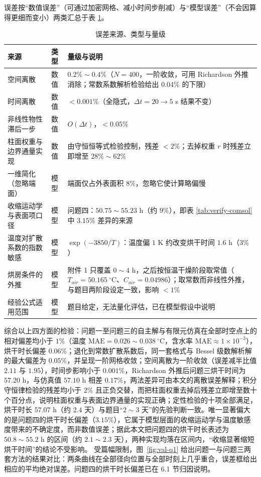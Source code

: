 \documentclass[12pt,a4paper]{article}
\begin{document}
误差按“数值误差”（可通过加密网格、减小时间步削减）与“模型误差”（不会因算得更细而变小）两类汇总于表 \ref{tab:error-source}。

\begin{table}[H]
\centering
\caption{误差来源、类型与量级}
\label{tab:error-source}
\small
\begin{tabular}{p{3.4cm}p{1.6cm}p{9.6cm}}
\toprule
来源 & 类型 & 量级与说明\\
\midrule
空间离散 & 数值 & $0.2\%\sim0.4\%$（$N=400$，一阶收敛，可用 Richardson 外推消除；常数系数解析检验给出 $0.04\%$ 的下限）\\
时间离散 & 数值 & $<0.001\%$（全隐式，$\Delta t=20\to5$ s 结果不变）\\
非线性物性滞后一步 & 数值 & $O(\Delta t)$，$<0.05\%$\\
柱面权重与边界通量实现 & 数值 & 由守恒恒等式检验控制，残差 $<2\%$；去掉权重 $r$ 时残差立即增至 $28\%\sim62\%$\\
一维简化（忽略端面） & 模型 & 端面仅占外表面积 $8\%$，忽略它使计算略偏慢\\
收缩运动学与表面项口径 & 模型 & 问题四：$50.75\sim55.23$ h（约 $9\%$），即表 \ref{tab:verify-comsol} 中 $3.15\%$ 差异的来源\\
温度对扩散系数的指数敏感 & 模型 & $\exp(-3850/T)$：温度偏 $1$ K 约改变烘干时间 $1.6$ h（$3\%$）\\
烘房条件的外推 & 模型 & 附件 1 只覆盖 $0\sim4$ h，之后按恒温干燥阶段取常值（$T_{air}=50.165\ \mathrm{^\circ C}$、$C_{air}=0.04986$）；取常数而非线性外推，与题目两阶段设定一致，影响 $<1\%$\\
经验公式适用范围 & 模型 & 题目给定，无法量化评估，已在模型假设中说明\\
\bottomrule
\end{tabular}
\end{table}

综合以上四方面的检验：问题一至问题三的自主解与有限元仿真在全部时空点上的相对偏差均小于 $1\%$（温度 $\mathrm{MAE}=0.026\sim0.038\ \mathrm{^\circ C}$，含水率 $\mathrm{MAE}\approx1\times10^{-3}$），烘干时长偏差 $0.06\%$；退化到常数扩散系数后，同一套格式与 Bessel 级数解析解的最大偏差为 $0.05\%$，并呈现一阶网格收敛；空间离散为一阶收敛（误差减半比值 $2.11$ 与 $1.95$），时间步影响小于 $0.001\%$，Richardson 外推后问题三烘干时间为 $57.20$ h，与仿真值 $57.10$ h 相差 $0.17\%$，两法差异可由本文的离散误差解释；积分守恒律检验的残差均小于 $2\%$ 且正负交替，而把柱面权重去掉后残差立即增至数十个百分点，说明柱面权重与表面边界通量的实现正确；定性检验的十项全部满足，烘干时长 $57.07$ h（约 $2.4$ 天）与题目“$2\sim3$ 天”的先验判断一致。唯一显著偏大的是问题四的烘干时长偏差（$3.15\%$），它属于模型层面的收缩运动学与温度敏感度带来的不确定度，而非数值误差；据此本文把问题四的烘干时长表述为 $50.8\sim55.2$ h 的区间（约 $2.1\sim2.3$ 天），两种实现均落在区间内，“收缩显著缩短烘干时间”的结论不受影响。
受篇幅限制，图~\ref{fig:val-q1} 给出问题一与问题三两套方法的结果对比：两条曲线在全部径向位置与全部时刻上几乎重合，误差框给出相应的平均绝对误差。问题四的烘干时长偏差已在 6.1 节归因说明。
\end{document}
